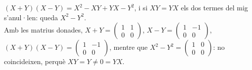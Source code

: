 \begin{apartats}
\begin{nomesllarg}
\begin{solucio}
$(X+Y)(X-Y)=X^2-XY+YX-Y^2$, i si $XY=YX$ els dos termes del mig s'anul·len: queda $X^2-Y^2$.\\
Amb les matrius donades, $X+Y=\begin{pmatrix}1&1\\0&0\end{pmatrix}$, $X-Y=\begin{pmatrix}1&-1\\0&0\end{pmatrix}$,
$(X+Y)(X-Y)=\begin{pmatrix}1&-1\\0&0\end{pmatrix}$, mentre que $X^2-Y^2=\begin{pmatrix}1&0\\0&0\end{pmatrix}$:
no coincideixen, perquè $XY=Y\ne0=YX$.
\end{solucio}
\end{nomesllarg}

\end{apartats}
